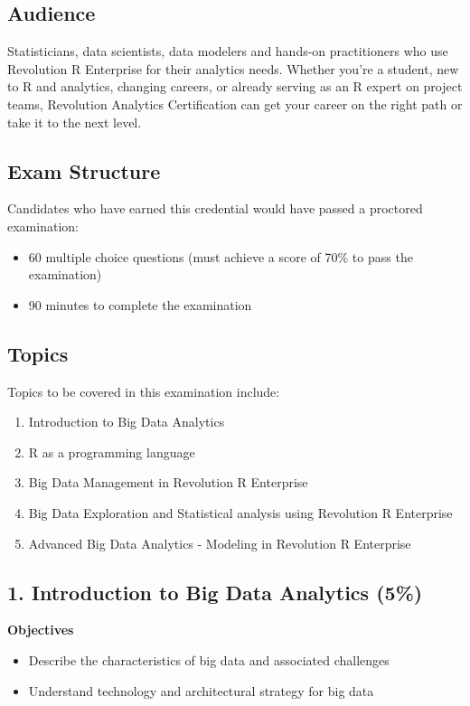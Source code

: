 \documentclass[]{article}
\begin{document}
\subsection*{Audience}

Statisticians, data scientists, data modelers and hands-on practitioners who use Revolution R Enterprise for their analytics needs. Whether you’re a student, new to R and analytics, changing careers, or already serving as an R expert on project teams, Revolution Analytics Certification can get your career on the right path or take it to the next level.

\subsection*{Exam Structure}

Candidates who have earned this credential would have passed a proctored examination:
\begin{itemize}
\item 60 multiple choice questions (must achieve a score of 70\% to pass the examination)
\item 90 minutes to complete the examination
\end{itemize}

\subsection*{Topics}
Topics to be covered in this examination include:
\begin{enumerate}
\item Introduction to Big Data Analytics
\item R as a programming language
\item Big Data Management in Revolution R Enterprise
\item Big Data Exploration and Statistical analysis using Revolution R Enterprise
\item Advanced Big Data Analytics - Modeling in Revolution R Enterprise
\end{enumerate}
\newpage


\subsection*{1. Introduction to Big Data Analytics (5\%)}

\textbf{Objectives}
\begin{itemize}
\item Describe the characteristics of big data and associated challenges

\item Understand technology and architectural strategy for big data
\end{itemize}
\end{document}
